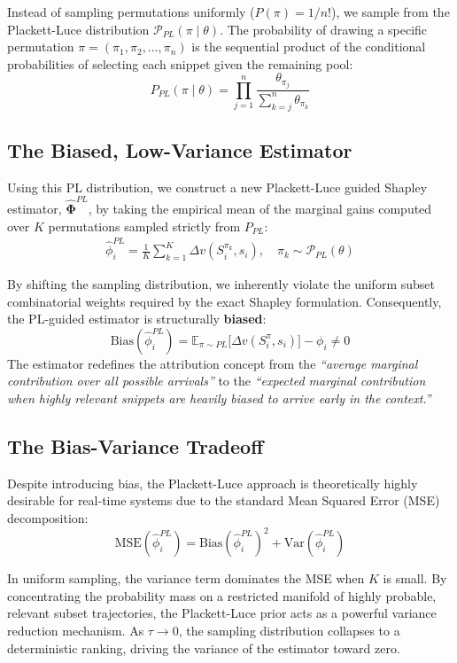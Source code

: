 \documentclass{article}
\begin{document}
Instead of sampling permutations uniformly ($P(\pi) = 1/n!$), we sample from the Plackett-Luce distribution $\mathcal{P}_{PL}(\pi \mid \theta)$. The probability of drawing a specific permutation $\pi = (\pi_1, \pi_2, \dots, \pi_n)$ is the sequential product of the conditional probabilities of selecting each snippet given the remaining pool:
$$ P_{PL}(\pi \mid \theta) = \prod_{j=1}^n \frac{\theta_{\pi_j}}{\sum_{k=j}^n \theta_{\pi_k}} $$

\subsection{The Biased, Low-Variance Estimator}

Using this PL distribution, we construct a new Plackett-Luce guided Shapley estimator, $\hat{\mathbf{\Phi}}^{PL}$, by taking the empirical mean of the marginal gains computed over $K$ permutations sampled strictly from $P_{PL}$:
\begin{align} \label{eq:pl_estimator}
\hat{\phi}_i^{PL} = \frac{1}{K} \sum_{k=1}^K \Delta v(S_i^{\pi_k}, s_i), \quad \pi_k \sim \mathcal{P}_{PL}(\theta)
\end{align}

By shifting the sampling distribution, we inherently violate the uniform subset combinatorial weights required by the exact Shapley formulation. Consequently, the PL-guided estimator is structurally \textbf{biased}:
$$ \text{Bias}(\hat{\phi}_i^{PL}) = \mathbb{E}_{\pi \sim PL} \big[ \Delta v(S_i^\pi, s_i) \big] - \phi_i \neq 0 $$
The estimator redefines the attribution concept from the \textit{``average marginal contribution over all possible arrivals''} to the \textit{``expected marginal contribution when highly relevant snippets are heavily biased to arrive early in the context.''}

\subsection{The Bias-Variance Tradeoff}

Despite introducing bias, the Plackett-Luce approach is theoretically highly desirable for real-time systems due to the standard Mean Squared Error (MSE) decomposition:
$$ \text{MSE}(\hat{\phi}_i^{PL}) = \text{Bias}(\hat{\phi}_i^{PL})^2 + \text{Var}(\hat{\phi}_i^{PL}) $$

In uniform sampling, the variance term dominates the MSE when $K$ is small. By concentrating the probability mass on a restricted manifold of highly probable, relevant subset trajectories, the Plackett-Luce prior acts as a powerful variance reduction mechanism. As $\tau \to 0$, the sampling distribution collapses to a deterministic ranking, driving the variance of the estimator toward zero. 
\end{document}
